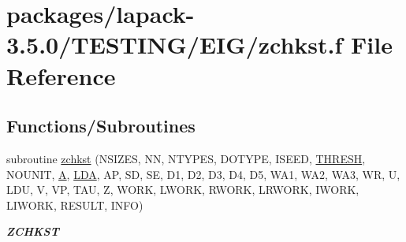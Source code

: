 \hypertarget{zchkst_8f}{}\section{packages/lapack-\/3.5.0/\+T\+E\+S\+T\+I\+N\+G/\+E\+I\+G/zchkst.f File Reference}
\label{zchkst_8f}
\subsection*{Functions/\+Subroutines}
\begin{DoxyCompactItemize}
\item 
subroutine \hyperlink{group__complex16__eig_ga23b67e5ea0fd86a8df3a60703acabef0}{zchkst} (N\+S\+I\+Z\+E\+S, N\+N, N\+T\+Y\+P\+E\+S, D\+O\+T\+Y\+P\+E, I\+S\+E\+E\+D, \hyperlink{zlaqgs_8c_a0656018abfc9fa2821827415f5d5ea57}{T\+H\+R\+E\+S\+H}, N\+O\+U\+N\+I\+T, \hyperlink{classA}{A}, \hyperlink{example__user_8c_ae946da542ce0db94dced19b2ecefd1aa}{L\+D\+A}, A\+P, S\+D, S\+E, D1, D2, D3, D4, D5, W\+A1, W\+A2, W\+A3, W\+R, U, L\+D\+U, V, V\+P, T\+A\+U, Z, W\+O\+R\+K, L\+W\+O\+R\+K, R\+W\+O\+R\+K, L\+R\+W\+O\+R\+K, I\+W\+O\+R\+K, L\+I\+W\+O\+R\+K, R\+E\+S\+U\+L\+T, I\+N\+F\+O)
\begin{DoxyCompactList}\small\item\em {\bfseries Z\+C\+H\+K\+S\+T} \end{DoxyCompactList}\end{DoxyCompactItemize}
